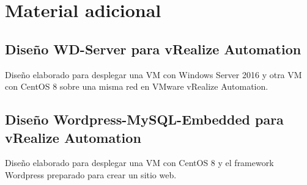 \chapter{Material adicional}
\label{chap:adicional}

% 
\section{Diseño WD-Server para vRealize Automation}
\label{appendix:wd-server-blueprint}
Diseño elaborado para desplegar una VM con Windows Server 2016 y otra VM con CentOS 8 sobre una misma red en VMware vRealize Automation.


\section{Diseño Wordpress-MySQL-Embedded para vRealize Automation}
\label{appendix:worpress-mysql-blueprint}
Diseño elaborado para desplegar una VM con CentOS 8 y el framework Wordpress preparado para crear un sitio web.

